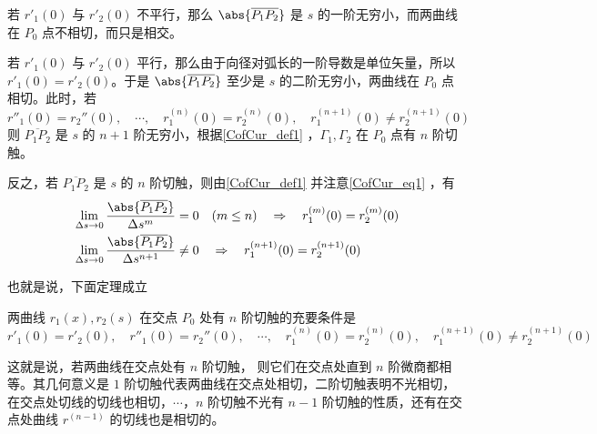 若 $r'_1(0)$ 与 $r'_2(0)$ 不平行，那么 $\abs{\overline{P_1P_2}}$ 是 $s$ 的一阶无穷小，而两曲线在 $P_0$ 点不相切，而只是相交。

若 $r'_1(0)$ 与 $r'_2(0)$ 平行，那么由于向径对弧长的一阶导数是单位矢量，所以 $r'_1(0)=r'_2(0)$。于是 $\abs{\overline{P_1P_2}}$ 至少是 $s$ 的二阶无穷小，两曲线在 $P_0$ 点相切。此时，若
\begin{equation}
r''_1(0)=r_2''(0),\quad\cdots,\quad r^{(n)}_1(0)=r^{(n)}_2(0),\quad r^{(n+1)}_1(0)\neq r^{(n+1)}_2(0)
\end{equation}
则 $\overline{P_1P_2}$ 是 $s$ 的 $n+1$ 阶无穷小，根据\autoref{CofCur_def1} ，$\Gamma_1,\Gamma_2$ 在 $P_0$ 点有 $n$ 阶切触。

反之，若 $\overline{P_1P_2}$ 是 $s$ 的 $n$ 阶切触，则由\autoref{CofCur_def1} 并注意\autoref{CofCur_eq1} ，有
\begin{equation}
\begin{aligned}
&\lim_{\Delta s\rightarrow0}\frac{\abs{\overline{P_1P_2}}}{\Delta s^{m}}=0\quad(m\leq n)\quad\Rightarrow \quad r^{(m)}_1(0)=r^{(m)}_2(0)\\
&\lim_{\Delta s\rightarrow0}\frac{\abs{\overline{P_1P_2}}}{\Delta s^{n+1}}\neq0\quad\Rightarrow\quad r^{(n+1)}_1(0)=r^{(n+1)}_2(0)
\end{aligned}
\end{equation}

也就是说，下面定理成立
\begin{theorem}{}
两曲线 $r_1(x),r_2(s)$ 在交点 $P_0$ 处有 $n$ 阶切触的充要条件是
\begin{equation}
r'_1(0)=r'_2(0),\quad r''_1(0)=r_2''(0),\quad\cdots,\quad r^{(n)}_1(0)=r^{(n)}_2(0),\quad r^{(n+1)}_1(0)\neq r^{(n+1)}_2(0)
\end{equation}
\end{theorem}
这就是说，若两曲线在交点处有 $n$ 阶切触， 则它们在交点处直到 $n$ 阶微商都相等。其几何意义是 $1$ 阶切触代表两曲线在交点处相切，二阶切触表明不光相切，在交点处切线的切线也相切，$\cdots$，$n$ 阶切触不光有 $n-1$ 阶切触的性质，还有在交点处曲线 $r^{(n-1)}$ 的切线也是相切的。   